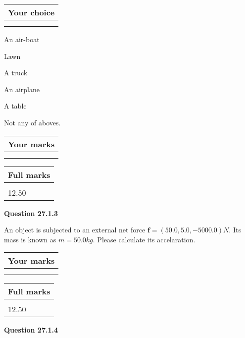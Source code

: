 \documentclass[12pt]{article}
\begin{document}
  
\noindent\hspace{3.0in} \begin{tabular}{|l|}
\hline
Your choice \\
\hline
 \\ 
 \\ 
\hline
\end{tabular}
  
  
 
 
An air-boat
 
 
Lawn
 
 
A truck
 
 
An airplane
 
 
A table
 
 
  Not any of aboves.
 
 
 
\vspace{0.3in}
  
\vspace{0.2in}
  
         \begin{tabular}{|l|}
\hline
 Your marks  \\
\hline
 \\ 
 \\ 
\hline
\end{tabular}
\hspace{0.05in} \begin{tabular}{|l|}
\hline
 Full marks  \\
\hline
 \\ 
12.50 \\
\hline
\end{tabular}
{\textbf{\Large{Question
27.1.3 
}}}
  
  
 
An object is subjected to an external net force $\mathbf{f}=(
50.0,  %
5.0,
-5000.0  )N$. Its mass is known as
$m= %
50.0 kg$. Please calculate its accelaration.
 
 

 

 
\vspace{0.3in}
  
\vspace{0.2in}
  
         \begin{tabular}{|l|}
\hline
 Your marks  \\
\hline
 \\ 
 \\ 
\hline
\end{tabular}
\hspace{0.05in} \begin{tabular}{|l|}
\hline
 Full marks  \\
\hline
 \\ 
12.50 \\
\hline
\end{tabular}
{\textbf{\Large{Question
27.1.4 
}}}
  
\end{document}
